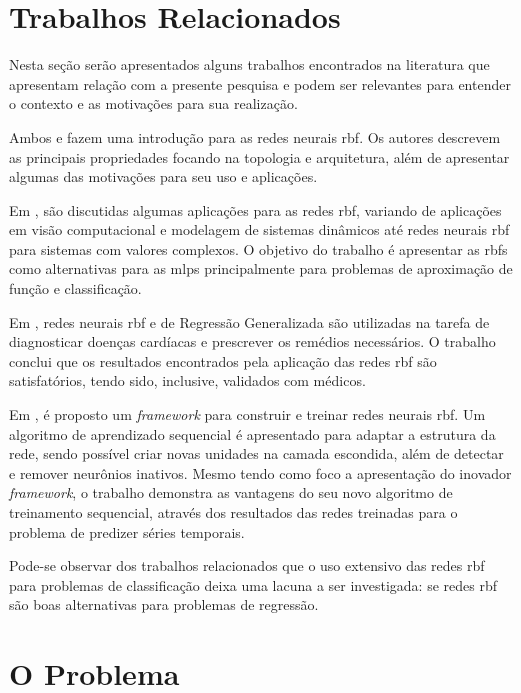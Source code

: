 \documentclass[conference]{IEEEtran}
\begin{document}
\section{Trabalhos Relacionados}
\label{relacionados}
Nesta seção serão apresentados alguns trabalhos encontrados na literatura que 
apresentam relação com a presente pesquisa e podem ser relevantes para entender 
o contexto e as motivações para sua realização.

Ambos \cite{orr1996introduction} e \cite{borsintroduction} fazem uma 
introdução para as redes neurais \ac*{rbf}. Os autores descrevem as principais 
propriedades focando na topologia e arquitetura, além de apresentar algumas das 
motivações para seu uso e aplicações.

Em \cite{wu2012using}, são discutidas algumas aplicações para as redes 
\ac*{rbf}, variando de aplicações em visão computacional e modelagem de sistemas 
dinâmicos até redes neurais \ac*{rbf} para sistemas com valores complexos. O 
objetivo do trabalho é apresentar as \acp*{rbf} como alternativas para as 
\acp*{mlp} principalmente para problemas de aproximação de função e 
classificação.

Em \cite{heartrbf}, redes neurais \ac*{rbf} e de Regressão Generalizada são 
utilizadas na tarefa de diagnosticar doenças cardíacas e prescrever os 
remédios necessários. O trabalho conclui que os resultados encontrados pela 
aplicação das redes \ac*{rbf} são satisfatórios, tendo sido, inclusive, 
validados com médicos.

Em \cite{rojas2002time}, é proposto um \textit{framework} para construir e 
treinar redes neurais \ac*{rbf}. Um algoritmo de aprendizado sequencial é 
apresentado para adaptar a estrutura da rede, sendo possível criar novas 
unidades na camada escondida, além de detectar e remover neurônios inativos.
Mesmo tendo como foco a apresentação do inovador \textit{framework}, o trabalho 
demonstra as vantagens do seu novo algoritmo de treinamento sequencial, através 
dos resultados das redes treinadas para o problema de predizer séries temporais.

Pode-se observar dos trabalhos relacionados que o uso extensivo das redes 
\ac*{rbf} para problemas de classificação deixa uma lacuna a ser investigada: 
se redes \ac*{rbf} são boas alternativas para problemas de regressão.

\section{O Problema}
\label{problema}
\end{document}
